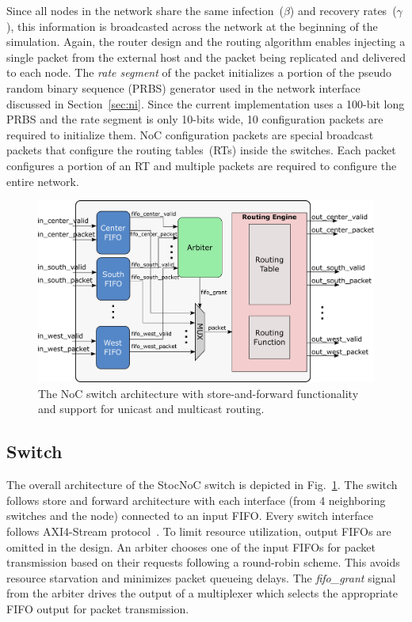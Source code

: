 Since all nodes in the network share the same infection~($\beta$) and recovery rates~($\gamma$), this information is broadcasted across the network at the beginning of the simulation. 
Again, the router design and the routing algorithm enables injecting a single packet from the external host and the packet being replicated and delivered to each node.
The \emph{rate segment} of the packet initializes a portion of the pseudo random binary sequence (PRBS) generator used in the network interface discussed in Section~\ref{sec:ni}.
Since the current implementation uses a 100-bit long PRBS and the rate segment is only 10-bits wide, 10 configuration packets are required to initialize them. 
NoC configuration packets are special broadcast packets that configure the routing tables~(RTs) inside the switches. 
Each packet configures a portion of an RT and multiple packets are required to configure the entire network.
\begin{figure}[t!]
	\begin{center}
    \includegraphics[width=0.8\columnwidth]{Figures/ROUTER.pdf}
    \caption{The NoC switch architecture with store-and-forward functionality and support for unicast and multicast routing.} 
    \label{figure:router}
    \end{center}
    \vspace{-5mm}
\end{figure}

\subsection{Switch}
The overall architecture of the StocNoC switch is depicted in Fig.~\ref{figure:router}.
The switch follows store and forward architecture with each interface (from 4 neighboring switches and the node) connected to an input FIFO.
Every switch interface follows AXI4-Stream protocol~\cite{xilinxaxi}.
To limit resource utilization, output FIFOs are omitted in the design.
An arbiter chooses one of the input FIFOs for packet transmission based on their requests following a round-robin scheme.
This avoids resource starvation and minimizes packet queueing delays. 
The \emph{fifo\_grant} signal from the arbiter drives the output of a multiplexer which selects the appropriate FIFO output for packet transmission. 

